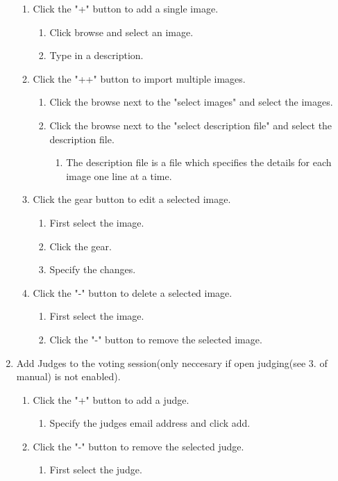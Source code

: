 \documentclass[10pt,a4paper]{article}
\begin{document}
\begin{enumerate}
\begin{enumerate}
\item Click the "+" button to add a single image.
\begin{enumerate}
\item Click browse and select an image.
\item Type in a description.
\end{enumerate}
\item Click the "++" button to import multiple images.
\begin{enumerate}
\item Click the browse next to the "select images" and select the images.
\item Click the browse next to the "select description file" and select the description file.
\begin{enumerate}
\item The description file is a file which specifies the details for each image one line at a time.
\end{enumerate}
\end{enumerate}
\item Click the gear button to edit a selected image.
\begin{enumerate}
\item First select the image.
\item Click the gear.
\item Specify the changes.
\end{enumerate}
\item Click the "-" button to delete a selected image.
\begin{enumerate}
\item First select the image.
\item Click the "-" button to remove the selected image.
\end{enumerate}
\end{enumerate}
\item Add Judges to the voting session(only neccesary if open judging(see 3. of manual) is not enabled).
\begin{enumerate}
\item Click the "+" button to add a judge.
\begin{enumerate}
\item Specify the judges email address and click add.
\end{enumerate}
\item Click the "-" button to remove the selected judge.
\begin{enumerate}
\item First select the judge.

\end{enumerate}
\end{enumerate}
\end{enumerate}
\end{document}
